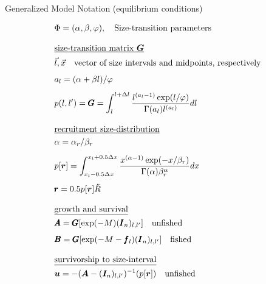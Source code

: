 \documentclass[final]{beamer} %
\begin{document}
\begin{frame}{}
\begin{columns}[t]
\begin{column}{.3\linewidth}
\begin{block}{\large Generalized Model Notation (equilibrium conditions)}
\begin{table}
\begin{align}
                &\Phi = (\alpha,\beta,\varphi), \quad \mbox{Size-transition parameters} \label{T1.3}\\[2ex]
                &\mbox{\underline{size-transition matrix $\bm{G}$}} \nonumber \\
                &\vec{l},\vec{x} \quad \mbox{vector of size intervals and midpoints, respectively} \nonumber\\[1ex]
                &a_{l} = (\alpha + \beta l)/\varphi \label{T1.4} \\[1ex]
                &p({l},{l'}) =\pmb{G}= \int_{l}^{l+\Delta l}
                    \frac{ l^{(a_{l}-1)} \exp(l/\varphi) }
                    { \Gamma(a_{l}) l^{(a_{l})} } dl \label{T1.5} \\[2ex]
                &\mbox{\underline{recruitment size-distribution}} \nonumber \\
                & \alpha = \alpha_r / \beta_r  \\[1ex]
                &p[\bm{r}] = \int_{x_l-0.5\Delta x}^{x_l+0.5\Delta x}
                  \frac{x^{(\alpha-1)}\exp(- x / \beta_r)}{\Gamma(\alpha)\beta_r^\alpha}dx
                    \label{T1.7}\\[1ex]
                &\pmb{r} = 0.5 p[\bm{r}] \ddot{R} \label{T1.8}\\[2ex]
                &\mbox{\underline{growth and survival}} \nonumber \\
                &\pmb{A} = \pmb{G} [\exp(-M) (\pmb{I}_n)_{l,l'}] \quad \mbox{unfished}\label{T1.10}\\[1ex]
                &\pmb{B} = \pmb{G} [\exp(-M - \pmb{f}_{l}) (\pmb{I}_n)_{l,l'}] \quad \mbox{fished} \label{T1.12}\\[2ex]
                &\mbox{\underline{survivorship to size-interval}} \nonumber \\
                & \bm{u}   = -(\bm{A} - (\bm{I}_n)_{l,l'})^{-1} (p[\bm{r}]) \quad \mbox{unfished} \label{T1.13a}\\[1ex]

\end{align}
\end{table}
\end{block}
\end{column}
\end{columns}
\end{frame}
\end{document}
